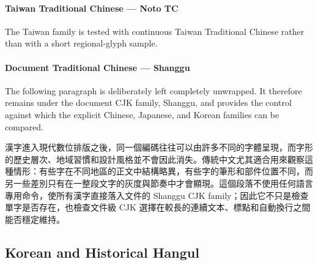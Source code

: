 

\paragraph{Taiwan Traditional Chinese --- Noto TC}

The Taiwan family is tested with continuous Taiwan Traditional Chinese rather
than with a short regional-glyph sample.



\paragraph{Document Traditional Chinese --- Shanggu}

The following paragraph is deliberately left completely unwrapped. It
therefore remains under the document CJK family, Shanggu, and provides the
control against which the explicit Chinese, Japanese, and Korean families can
be compared.

漢字進入現代數位排版之後，同一個編碼往往可以由許多不同的字體呈現，而字形的歷史層次、地域習慣和設計風格並不會因此消失。傳統中文尤其適合用來觀察這種情形：有些字在不同地區的正文中結構略異，有些字的筆形和部件位置不同，而另一些差別只有在一整段文字的灰度與節奏中才會顯現。這個段落不使用任何語言專用命令，使所有漢字直接落入文件的 Shanggu CJK family；因此它不只是檢查單字是否存在，也檢查文件級 CJK 選擇在較長的連續文本、標點和自動換行之間能否穩定維持。


\subsection{Korean and Historical Hangul}

